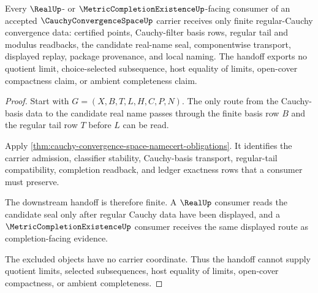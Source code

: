 \begin{theorem}
\label{thm:cauchy-convergence-space-real-completion-handoff}
Every $\RealUp$- or $\MetricCompletionExistenceUp$-facing consumer of an accepted $\CauchyConvergenceSpaceUp$ carrier receives only finite regular-Cauchy convergence data: certified points, Cauchy-filter basis rows, regular tail and modulus readbacks, the candidate real-name seal, componentwise transport, displayed replay, package provenance, and local naming. The handoff exports no quotient limit, choice-selected subsequence, host equality of limits, open-cover compactness claim, or ambient completeness claim.
\end{theorem}
\begin{proof}
Start with $G=(X,B,T,L,H,C,P,N)$. The only route from the Cauchy-basis data to the candidate real name passes through the finite basis row $B$ and the regular tail row $T$ before $L$ can be read.

Apply \autoref{thm:cauchy-convergence-space-namecert-obligations}. It identifies the carrier admission, classifier stability, Cauchy-basis transport, regular-tail compatibility, completion readback, and ledger exactness rows that a consumer must preserve.

The downstream handoff is therefore finite. A $\RealUp$ consumer reads the candidate seal only after regular Cauchy data have been displayed, and a $\MetricCompletionExistenceUp$ consumer receives the same displayed route as completion-facing evidence.

The excluded objects have no carrier coordinate. Thus the handoff cannot supply quotient limits, selected subsequences, host equality of limits, open-cover compactness, or ambient completeness.
\end{proof}


\begin{closurestatus}{\CauchyConvergenceSpaceUp}
  \theoryclosure{\seedClosure}
  \formalstatus{\unformalizedV}
\end{closurestatus}
